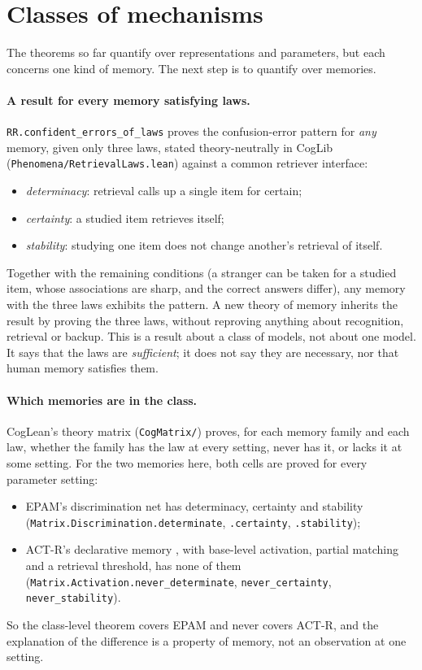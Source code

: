 \documentclass[11pt]{article}
\newcommand{\code}[1]{\texttt{#1}}
\newcommand{\lean}[1]{\texttt{#1}}
\begin{document}
\section{Classes of mechanisms}
\label{sec:classes}

The theorems so far quantify over representations and parameters, but each concerns one kind of memory. The next step is to quantify over memories.

\paragraph{A result for every memory satisfying laws.} \lean{RR.confident\_errors\_of\_laws} proves the confusion-error pattern for \emph{any} memory, given only three laws, stated theory-neutrally in CogLib (\code{Phenomena/RetrievalLaws.lean}) against a common retriever interface:
\begin{itemize}
  \item \emph{determinacy}: retrieval calls up a single item for certain;
  \item \emph{certainty}: a studied item retrieves itself;
  \item \emph{stability}: studying one item does not change another's retrieval of itself.
\end{itemize}
Together with the remaining conditions (a stranger can be taken for a studied item, whose associations are sharp, and the correct answers differ), any memory with the three laws exhibits the pattern. A new theory of memory inherits the result by proving the three laws, without reproving anything about recognition, retrieval or backup. This is a result about a class of models, not about one model. It says that the laws are \emph{sufficient}; it does not say they are necessary, nor that human memory satisfies them.

\paragraph{Which memories are in the class.} CogLean's theory matrix (\code{CogMatrix/}) proves, for each memory family and each law, whether the family has the law at every setting, never has it, or lacks it at some setting. For the two memories here, both cells are proved for every parameter setting:
\begin{itemize}
  \item EPAM's discrimination net has determinacy, certainty and stability (\lean{Matrix.Discrimination.determinate}, \lean{.certainty}, \lean{.stability});
  \item ACT-R's declarative memory \citep{anderson2007}, with base-level activation, partial matching and a retrieval threshold, has none of them (\lean{Matrix.Activation.never\_determinate}, \lean{never\_certainty}, \lean{never\_stability}).
\end{itemize}
So the class-level theorem covers EPAM and never covers ACT-R, and the explanation of the difference is a property of memory, not an observation at one setting.
\end{document}
